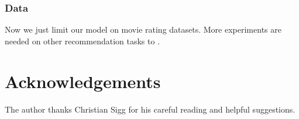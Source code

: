 \documentclass[10pt,conference,compsocconf]{IEEEtran}
\begin{document}
\subsubsection{Data} 
Now we just limit our model on movie rating datasets. More experiments are needed on other recommendation tasks to .




\section*{Acknowledgements}
The author thanks Christian Sigg for his careful reading and helpful
suggestions.



\end{document}
